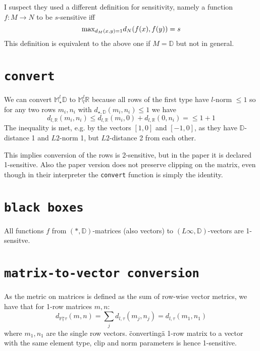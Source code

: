 \documentclass{article}
\begin{document}
I suspect they used a different definition for sensitivity, namely a function $f:M\rightarrow N$ to be $s$-sensitive iff
\[\textnormal{max}_{d_M(x,y)=1} d_N(f(x),f(y)) = s\]
This definition is equivalent to the above one if $M = \mathbb{D}$ but not in general.

\section*{\texttt{convert}}
We can convert $\mathbb{M}^l_\star\mathbb{D}$ to $ \mathbb{M}^l_l\mathbb{R}$ because all rows of the first type have $l$-norm $\leq 1$ so for any two rows $m_i,n_i$ with $d_{\star,\mathbb{D}}(m_i,n_i) \leq 1$ we have 
      $$d_{l,\mathbb{R}}(m_i,n_i) \leq d_{l,\mathbb{R}}(m_i,0) + d_{l,\mathbb{R}}(0,n_i)  = \leq 1 + 1$$
The inequality is met, e.g. by the vectors $[1,0]$ and $[-1,0]$, as they have $\mathbb{D}$-distance 1 and $L2$-norm 1, but $L2$-distance 2 from each other.

This implies conversion of the rows is 2-sensitive, but in the paper it is declared 1-sensitive. Also the paper version does not preserve clipping on the matrix, even though in their interpreter the \texttt{convert} function is simply the identity.

\section*{\texttt{black boxes}}
All functions $f$ from $(*,\mathbb{D})$-matrices (also vectors) to $(L\infty,\mathbb{D})$-vectors are 1-sensitve.

\section*{\texttt{matrix-to-vector conversion}}
As the metric on matrices is defined as the sum of row-wise vector metrics, we have that for 1-row matrices $m,n$: 
$$d_{\mathbb{M}^\star_l\tau}(m,n) = \sum_j d_{l,\tau}(m_j,n_j) = d_{l,\tau}(m_1,n_1)$$
where $m_1, n_1$ are the single row vectors. \"converting\" a 1-row matrix to a vector with the same element type, clip and norm parameters is hence 1-sensitive.
\end{document}
